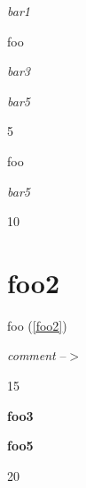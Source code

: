
\def\mytitle{HTML Blocks}


\emph{bar1}

foo

\emph{bar3}


\emph{bar5}

5

foo

\emph{bar5}

10

\part{foo2 }
\label{foo2}

foo (\autoref{foo2})

\emph{comment} --$>$

15

\textbf{foo3}

\textbf{foo5}

20



